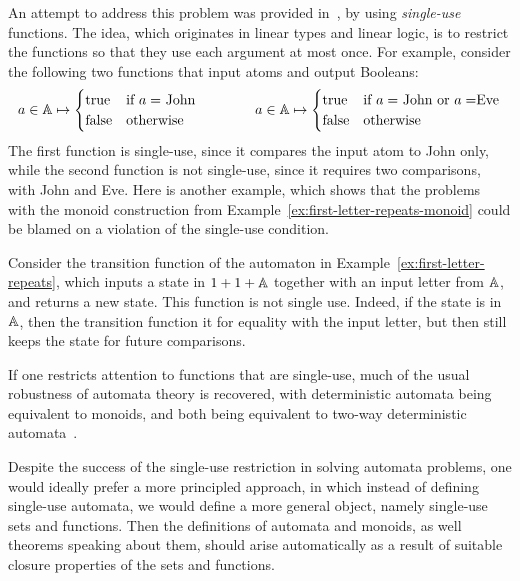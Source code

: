 An attempt to address this problem was provided in~\cite{stefansk-msc,stefanski-phd,bojanczykstefanski2020}, by using \emph{single-use} functions. The idea, which originates in linear types and linear logic,  is to restrict the functions so that they use each argument at most once. For example, consider the following two functions that input atoms and output Booleans:
\begin{align*}
a \in \mathbb A \mapsto 
\begin{cases}
    \text{true} & \text{if $a=$ John}\\
    \text{false} & \text{otherwise}
\end{cases}
\qquad \qquad 
a \in \mathbb A \mapsto 
\begin{cases}
    \text{true} & \text{if $a=$ John or $a = $Eve}\\
    \text{false} & \text{otherwise}
\end{cases}
\end{align*}
The first function is single-use, since it compares the input atom to John only, while the second function is not single-use, since it requires two comparisons, with John and Eve. Here is another example, which shows that the problems with the monoid construction from Example~\ref{ex:first-letter-repeats-monoid} could be blamed on a violation of the single-use condition.
\begin{example}
    Consider  the transition function of the automaton in Example~\ref{ex:first-letter-repeats}, which inputs a state in $1 + 1 + \mathbb A$ together with an input letter from $\mathbb A$, and returns a new state.  This function is not single use. Indeed, if the state is in $\mathbb A$, then the transition function it for equality with the input letter, but then still keeps the state for future comparisons. \exampleend
\end{example}

If one restricts attention to functions that are single-use, much of the usual robustness of automata theory is recovered, with deterministic automata being equivalent to monoids, and both being equivalent to two-way deterministic automata~\cite{bojanczykstefanski2020}.

Despite the success of the single-use restriction in solving automata problems, one would ideally prefer a more principled approach, in which instead of defining single-use automata, we would define a more general object, namely single-use sets and functions. Then the definitions of  automata and monoids, as well theorems speaking about them, should arise automatically as a result of suitable closure properties of the sets and functions.

